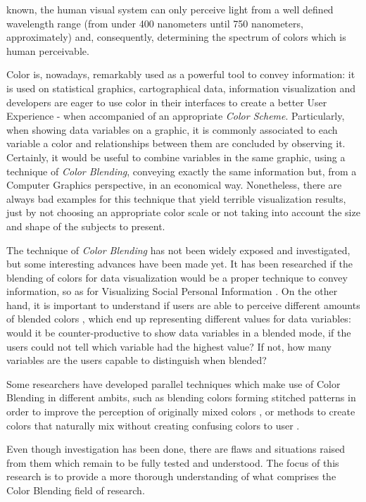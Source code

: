 \documentclass{report}
\begin{document}
known, the human visual system can only perceive light from a well defined wavelength range (from under 400
nanometers until 750 nanometers, approximately) and, consequently, determining the spectrum of colors which
is human perceivable. \par
Color is, nowadays, remarkably used as a powerful tool to convey information: it is used on statistical graphics,
cartographical data, information visualization and developers are eager to use color in their interfaces to 
create a better User Experience - when accompanied of an appropriate \emph{Color Scheme}. Particularly, when showing data
variables on a graphic, it is commonly associated to each variable a color and relationships between them are
concluded by observing it. Certainly, it would be useful to combine variables in the same graphic, using a technique of
\emph{Color Blending}, conveying exactly the same information but, from a Computer Graphics perspective, in an economical way.
Nonetheless, there are always bad examples for this technique
that yield terrible visualization results, just by not choosing an appropriate color scale or not taking into
account the size and shape of the subjects to present. \par
The technique of \emph{Color Blending} has not been widely exposed and investigated, but some interesting advances have
been made yet. It has been researched if the blending of colors for data visualization \cite{Gama20141} would be a proper
technique to convey information, so as for Visualizing Social Personal Information \cite{Gama20143}. On the other hand, it is
important to understand if users are able to perceive different amounts of blended colors \cite{Gama20142}, which end up representing
different values for data variables: would it be counter-productive to show data variables in a blended mode, if
the users could not tell which variable had the highest value? If not, how many variables are the users capable
to distinguish when blended? \par
Some researchers have developed parallel techniques which make use of Color Blending in different
ambits, such as blending colors forming stitched patterns in order to improve the perception of originally mixed
colors \cite{Urness2003}, or methods to create colors that naturally mix without creating confusing colors to user \cite{Chuang2009}. \par
Even though investigation has been done, there are flaws and situations raised from them which remain to be fully tested and understood.
The focus of this research is to provide a more thorough understanding of what comprises the Color
Blending field of research.  
\end{document}
